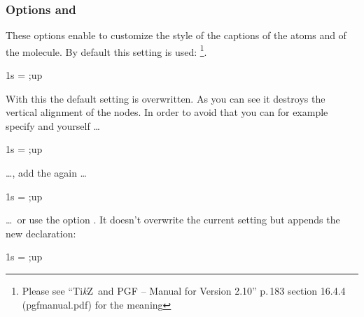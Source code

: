 \documentclass[load-preamble+]{cnltx-doc}
\newcommand*\TikZ{Ti\textit{k}Z}
\begin{document}
\subsubsection{Options  and }\label{option:names_style}
These options enable to customize the style of the captions of the atoms and
of the molecule. By default this setting is used:
\footnote{Please see ``\TikZ\ and PGF -- Manual
  for Version 2.10'' p.\,183 section 16.4.4 (pgfmanual.pdf) for the meaning}.
\begin{example}
  \begin{modiagram}[names,names-style={draw=blue}]
     { 1s = {;up} }
  \end{modiagram}
\end{example}

With this the default setting is overwritten. As you can see it destroys the
vertical alignment of the nodes. In order to avoid that you can for example
specify  and  yourself \ldots
\begin{example}
  \begin{modiagram}[names,names-style={text height=1.5ex, text depth=.25ex, draw=blue}]
     { 1s = {;up} }
  \end{modiagram}
\end{example}

\ldots, add the  again \ldots
\begin{example}
  \begin{modiagram}[names,names-style={anchor=base, draw=blue}]
     { 1s = {;up} }
  \end{modiagram}
\end{example}

\ldots\ or use the option . It doesn't overwrite the
current setting but appends the new declaration:
\begin{example}
  \begin{modiagram}[names,names-style-add={draw=blue}]
     { 1s = {;up} }
  \end{modiagram}
\end{example}
\end{document}
